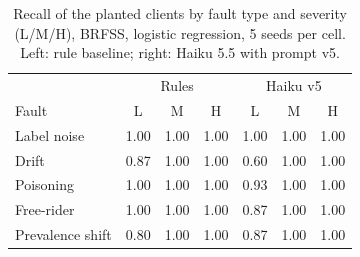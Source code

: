 \begin{table}[t]
\centering
\small
\setlength{\tabcolsep}{3pt}
\caption{Recall of the planted clients by fault type and severity (L/M/H), BRFSS, logistic regression, 5 seeds per cell. Left: rule baseline; right: Haiku 5.5 with prompt v5.}
\label{tab:recall}
\begin{tabular}{l|ccc|ccc}
\toprule
 & \multicolumn{3}{c}{Rules} & \multicolumn{3}{c}{Haiku v5} \\
Fault & L & M & H & L & M & H \\
\midrule
Label noise & \cellcolor[RGB]{205,226,251}\textcolor[HTML]{04050C}{1.00} & \cellcolor[RGB]{205,226,251}\textcolor[HTML]{04050C}{1.00} & \cellcolor[RGB]{205,226,251}\textcolor[HTML]{04050C}{1.00} & \cellcolor[RGB]{205,226,251}\textcolor[HTML]{04050C}{1.00} & \cellcolor[RGB]{205,226,251}\textcolor[HTML]{04050C}{1.00} & \cellcolor[RGB]{205,226,251}\textcolor[HTML]{04050C}{1.00} \\
Drift & \cellcolor[RGB]{161,199,244}\textcolor[HTML]{04050C}{0.87} & \cellcolor[RGB]{205,226,251}\textcolor[HTML]{04050C}{1.00} & \cellcolor[RGB]{205,226,251}\textcolor[HTML]{04050C}{1.00} & \cellcolor[RGB]{67,141,230}\textcolor[HTML]{04050C}{0.60} & \cellcolor[RGB]{205,226,251}\textcolor[HTML]{04050C}{1.00} & \cellcolor[RGB]{205,226,251}\textcolor[HTML]{04050C}{1.00} \\
Poisoning & \cellcolor[RGB]{205,226,251}\textcolor[HTML]{04050C}{1.00} & \cellcolor[RGB]{205,226,251}\textcolor[HTML]{04050C}{1.00} & \cellcolor[RGB]{205,226,251}\textcolor[HTML]{04050C}{1.00} & \cellcolor[RGB]{183,212,248}\textcolor[HTML]{04050C}{0.93} & \cellcolor[RGB]{205,226,251}\textcolor[HTML]{04050C}{1.00} & \cellcolor[RGB]{205,226,251}\textcolor[HTML]{04050C}{1.00} \\
Free-rider & \cellcolor[RGB]{205,226,251}\textcolor[HTML]{04050C}{1.00} & \cellcolor[RGB]{205,226,251}\textcolor[HTML]{04050C}{1.00} & \cellcolor[RGB]{205,226,251}\textcolor[HTML]{04050C}{1.00} & \cellcolor[RGB]{161,199,244}\textcolor[HTML]{04050C}{0.87} & \cellcolor[RGB]{205,226,251}\textcolor[HTML]{04050C}{1.00} & \cellcolor[RGB]{205,226,251}\textcolor[HTML]{04050C}{1.00} \\
Prevalence shift & \cellcolor[RGB]{138,185,241}\textcolor[HTML]{04050C}{0.80} & \cellcolor[RGB]{205,226,251}\textcolor[HTML]{04050C}{1.00} & \cellcolor[RGB]{205,226,251}\textcolor[HTML]{04050C}{1.00} & \cellcolor[RGB]{161,199,244}\textcolor[HTML]{04050C}{0.87} & \cellcolor[RGB]{205,226,251}\textcolor[HTML]{04050C}{1.00} & \cellcolor[RGB]{205,226,251}\textcolor[HTML]{04050C}{1.00} \\

\end{tabular}
\end{table}

